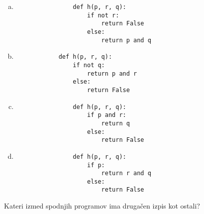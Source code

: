 \documentclass[arhiv, 10pt]{../izpit}
\begin{document}
        \begin{multicols}{2}
        \begin{enumerate}[(a)]
\item 
                \begin{verbatim}
                def h(p, r, q):
                    if not r:
                        return False
                    else:
                        return p and q
                \end{verbatim}
            
\item 
            \begin{verbatim}
            def h(p, r, q):
                if not q:
                    return p and r
                else:
                    return False
            \end{verbatim}
        
\item 
                \begin{verbatim}
                def h(p, r, q):
                    if p and r:
                        return q
                    else:
                        return False
                \end{verbatim}
            
\item 
                \begin{verbatim}
                def h(p, r, q):
                    if p:
                        return r and q
                    else:
                        return False
                \end{verbatim}
            
\end{enumerate}

        \end{multicols}
    
        \naloga*
        
        Kateri izmed spodnjih programov ima drugačen izpis kot ostali?
    
\end{document}

